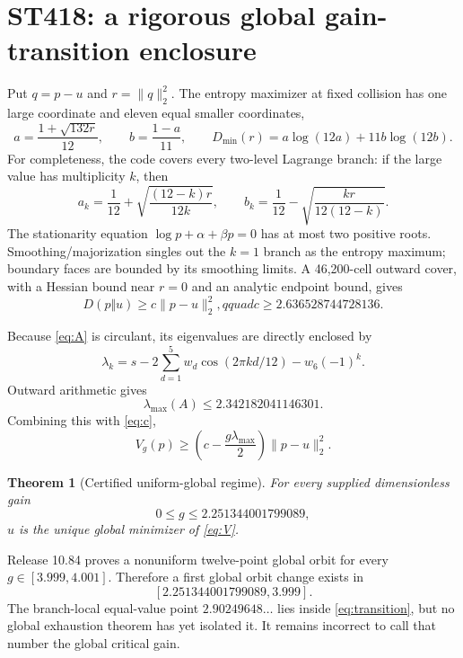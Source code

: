 \documentclass[11pt,a4paper]{article}
\newtheorem{theorem}{Theorem}
\begin{document}
\section{ST418: a rigorous global gain-transition enclosure}

Put $q=p-u$ and $r=\lVert q\rVert_2^2$.  The entropy maximizer at fixed
collision has one large coordinate and eleven equal smaller coordinates,
\begin{equation}\label{eq:Dmin}
 a=\frac{1+\sqrt{132r}}{12},\qquad b=\frac{1-a}{11},\qquad
 D_{\min}(r)=a\log(12a)+11b\log(12b).
\end{equation}
For completeness, the code covers every two-level Lagrange branch: if the
large value has multiplicity $k$, then
\[
 a_k=\frac1{12}+\sqrt{\frac{(12-k)r}{12k}},\qquad
 b_k=\frac1{12}-\sqrt{\frac{kr}{12(12-k)}}.
\]
The stationarity equation $\log p+\alpha+\beta p=0$ has at most two positive
roots.  Smoothing/majorization singles out the $k=1$ branch as the entropy
maximum; boundary faces are bounded by its smoothing limits.  A 46,200-cell
outward cover, with a Hessian bound near $r=0$ and an analytic endpoint bound,
gives
\begin{equation}\label{eq:c}
 D(p\Vert u)\ge c\lVert p-u\rVert_2^2,qquad
 c\ge2.636528744728136.
\end{equation}

Because \eqref{eq:A} is circulant, its eigenvalues are directly enclosed by
\[
 \lambda_k=s-2\sum_{d=1}^{5}w_d\cos(2\pi kd/12)-w_6(-1)^k.
\]
Outward arithmetic gives
\[
 \lambda_{\max}(A)\le2.342182041146301.
\]
Combining this with \eqref{eq:c},
\[
 V_g(p)\ge\left(c-\frac{g\lambda_{\max}}2\right)\lVert p-u\rVert_2^2.
\]

\begin{theorem}[Certified uniform-global regime]
For every supplied dimensionless gain
\[
 0\le g\le2.251344001799089,
\]
$u$ is the unique global minimizer of \eqref{eq:V}.
\end{theorem}

Release 10.84 proves a nonuniform twelve-point global orbit for every
$g\in[3.999,4.001]$.  Therefore a first global orbit change exists in
\begin{equation}\label{eq:transition}
 [2.251344001799089,3.999].
\end{equation}
The branch-local equal-value point $2.90249648\ldots$ lies inside
\eqref{eq:transition}, but no global exhaustion theorem has yet isolated it.
It remains incorrect to call that number the global critical gain.
\end{document}
